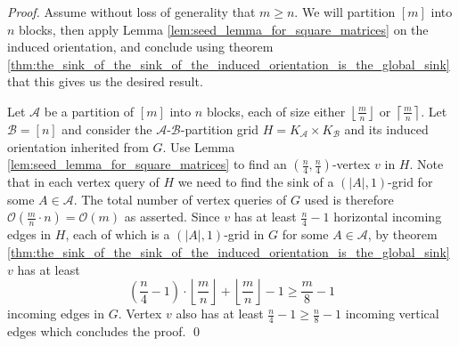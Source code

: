 \documentclass[runningheads,a4paper]{llncs}
\newcommand{\A}{\ensuremath{\mathcal A}}
\newcommand{\B}{\ensuremath{\mathcal B}}
\begin{document}
\begin{proof}
 Assume without loss of generality that $m \geq n$. 
 We will partition $[m]$ into $n$ blocks, then apply Lemma \ref{lem:seed_lemma_for_square_matrices} on the induced orientation, and conclude using theorem \ref{thm:the_sink_of_the_sink_of_the_induced_orientation_is_the_global_sink} that this  gives us the desired result.
 
  Let $\A$ be a partition of $[m]$ into $n$ blocks, each of size either $\left\lfloor \frac{m}{n} \right\rfloor$ or $\left\lceil \frac{m}{n} \right\rceil$. Let $\B = [n]$ and 
consider the $\A$-$\B$-partition grid $H = K_\A\times K_\B$ and its induced orientation inherited from $G$. 
 Use Lemma \ref{lem:seed_lemma_for_square_matrices} to find an $(\frac{n}{4}, \frac{n}{4})$-vertex $v$ in $H$. 
 Note that in each vertex query of $H$ we need to find the sink of a $(|A|,1)$-grid for some $A\in \A$. 
 The total number of vertex queries of $G$ used is therefore $\mathcal{O}(\frac{m}{n}\cdot n) = \mathcal{O}(m)$ as asserted. 
 Since $v$ has at least $\frac{n}{4} - 1$ horizontal incoming edges in $H$, each of which is a $(|A|,1)$-grid in $G$ for some $A\in \A$, 
 by theorem \ref{thm:the_sink_of_the_sink_of_the_induced_orientation_is_the_global_sink} $v$ has at least $$\left(\frac{n}{4} - 1\right)\cdot\left\lfloor \frac{m}{n} \right\rfloor + \left\lfloor \frac{m}{n} \right\rfloor - 1 \geq \frac{m}{8} - 1$$ incoming edges in $G$.
 Vertex $v$ also has at least $\frac{n}{4} - 1 \geq \frac{n}{8} - 1$ incoming vertical edges which concludes the proof. \qed
\end{proof}


\end{document}
